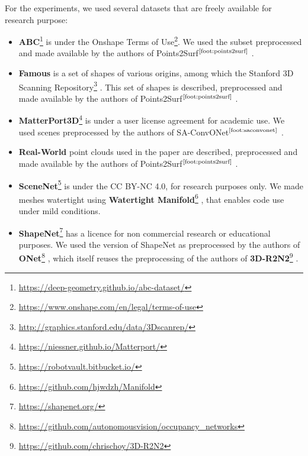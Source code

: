 \documentclass[10pt,twocolumn,letterpaper]{article}
\newcommand{\footnoteref}[1]{$^{\text{\ref{#1}}}$}
\begin{document}
For the experiments, we used several datasets that are freely available for research purpose:
\begin{itemize}[itemsep=4pt,topsep=4pt, parsep=0pt]

    \item \textbf{ABC}\footnote{\label{foot:abc}\url{https://deep-geometry.github.io/abc-dataset/}} is under the Onshape Terms of Use\footnote{\url{https://www.onshape.com/en/legal/terms-of-use}}. We used the subset preprocessed and made available by the authors of Points2Surf\footnoteref{foot:points2surf} \cite{Erler2020Points2Surf}.
    
    \item \textbf{Famous} is a set of shapes of various origins, among which the Stanford 3D Scanning Repository\footnote{\url{http://graphics.stanford.edu/data/3Dscanrep/}} \cite{krishnamurthy1996fitting}. This set of shapes is described, preprocessed and made available by the authors of Points2Surf\footnoteref{foot:points2surf} \cite{Erler2020Points2Surf}.

    \item \textbf{MatterPort3D}\footnote{\label{foot:matterport3d}\url{https://niessner.github.io/Matterport/}} \cite{chang2017matterport3d} is under a user license agreement for academic use. We used scenes preprocessed by the authors of SA-ConvONet\footnoteref{foot:saconvonet} \cite{tang2021sign}.

    \item \textbf{Real-World} point clouds used in the paper are described, preprocessed and made available by the authors of Points2Surf\footnoteref{foot:points2surf} \cite{Erler2020Points2Surf}.

    \item \textbf{SceneNet}\footnote{\url{https://robotvault.bitbucket.io/}} \cite{handa2015scenenet, handa2016scenenet, Handa2016Understanding} is under the CC BY-NC 4.0,
    for research purposes only. We made meshes watertight using \textbf{Watertight Manifold}\footnote{\label{foot:watertightmanifold}\url{https://github.com/hjwdzh/Manifold}} \cite{huang2018robust}, that enables code use under mild conditions.

    \item \textbf{ShapeNet}\footnote{\label{foot:shapenet}\url{https://shapenet.org/}} \cite{Chang2015ARXIV} has a licence for non commercial research or educational purposes. We used the version of ShapeNet as preprocessed by the authors of \textbf{ONet}\footnote{\label{foot:onet}\url{https://github.com/autonomousvision/occupancy_networks}}  \cite{Mescheder2019CVPR}, which itself reuses the preprocessing of the authors of \textbf{3D-R2N2}\footnote{\label{foot:3dr2n2}\url{https://github.com/chrischoy/3D-R2N2}} \cite{Choy2016ECCV}.


\end{itemize}
\end{document}
